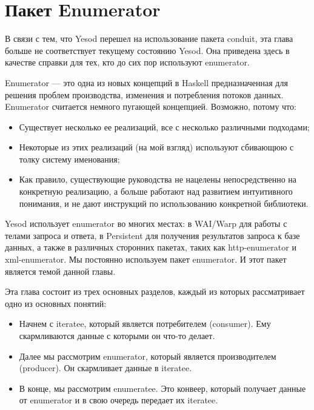 \chapter{Пакет Enumerator}\label{chap:enumerator}


\begin{remark}
В связи с тем, что Yesod перешел на использование пакета conduit, эта глава больше не соответствует текущему состоянию Yesod. Она приведена здесь в качестве справки для тех, кто до сих пор используют enumerator.
\end{remark}

Enumerator --- это одна из новых концепций в Haskell предназначенная для решения проблем производства, изменения и потребления потоков данных. Enumerator считается немного пугающей концепцией. Возможно, потому что:

\begin{itemize}
\item Существует несколько ее реализаций, все с несколько различными подходами;
\item Некоторые из этих реализаций (на мой взгляд) используют сбивающюю с толку систему именования;
\item Как правило, существующие руководства не нацелены непосредственно на конкретную реализацию, а больше работают над развитием интуитивного понимания, и не дают инструкций по использованию конкретной библиотеки.
\end{itemize}

Yesod использует enumerator во многих местах: в WAI/Warp для работы с телами запроса и ответа, в Persistent для получения результатов запроса к базе данных, а также в различных сторонних пакетах, таких как http-enumerator и xml-enumerator. Мы постоянно используем пакет enumerator. И этот пакет является темой данной главы.

Эта глава состоит из трех основных разделов, каждый из которых рассматривает одно из основных понятий:

\begin{itemize}
\item Начнем с iteratee, который является потребителем (consumer). Ему скармливаются данные с которыми он что-то делает.
\item Далее мы рассмотрим enumerator, который является производителем (producer). Он скармливает данные в iteratee.
\item В конце, мы рассмотрим enumeratee. Это конвеер, который получает данные от enumerator и в свою очередь передает их iteratee.
\end{itemize}


